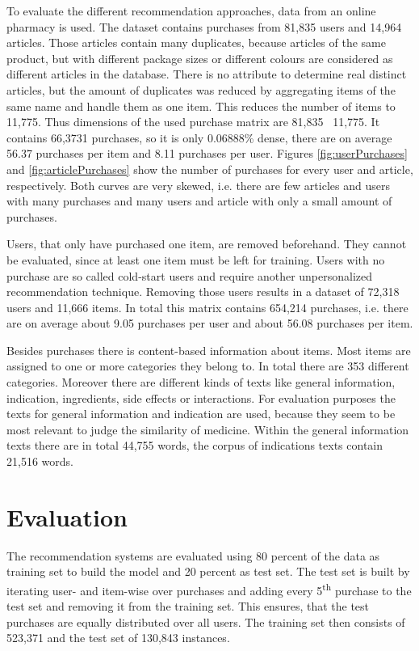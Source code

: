 \documentclass[10pt]{reportMaster}
\begin{document}
To evaluate the different recommendation approaches, data from an online pharmacy is used.
The dataset contains purchases from 81,835 users and 14,964 articles.
Those articles contain many duplicates, because articles of the same product, but with different package sizes or different colours are considered as different articles in the database.
There is no attribute to determine real distinct articles, but the amount of duplicates was reduced by aggregating items of the same name and handle them as one item.
This reduces the number of items to 11,775.
Thus dimensions of the used purchase matrix are 81,835 \texttimes \ 11,775.
It contains 66,3731 purchases, so it is only 0.06888\% dense, there are on average 56.37 purchases per item and 8.11 purchases per user. %
Figures \ref{fig:userPurchases} and \ref{fig:articlePurchases} show the number of purchases for every user and article, respectively.
Both curves are very skewed, i.e. there are few articles and users with many purchases and many users and article with only a small amount of purchases.

Users, that only have purchased one item, are removed beforehand.
They cannot be evaluated, since at least one item must be left for training.
Users with no purchase are so called cold-start users and require another unpersonalized recommendation technique.
Removing those users results in a dataset of 72,318 users and 11,666 items.
In total this matrix contains 654,214 purchases, i.e. there are on average about 9.05 purchases per user and about 56.08 purchases per item.

Besides purchases there is content-based information about items.
Most items are assigned to one or more categories they belong to.
In total there are 353 different categories.
Moreover there are different kinds of texts like general information, indication, ingredients, side effects or interactions.
For evaluation purposes the texts for general information and indication are used, because they seem to be most relevant to judge the similarity of medicine.
Within the general information texts there are in total 44,755 words, the corpus of indications texts contain 21,516 words.


 \section{Evaluation}
\label{sec:eval}
The recommendation systems are evaluated using 80 percent of the data as training set to build the model and 20 percent as test set.
The test set is built by iterating user- and item-wise over purchases and adding every 5\textsuperscript{th} purchase to the test set and removing it from the training set.
This ensures, that the test purchases are equally distributed over all users.
The training set then consists of 523,371 and the test set of 130,843 instances.
\end{document}
